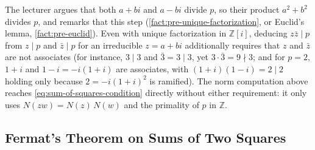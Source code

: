 \begin{aiNote}
The lecturer argues that both $a + bi$ and $a - bi$ divide $p$, so their product $a^2 + b^2$ divides $p$, and remarks that this step  (\cref{fact:pre-unique-factorization}, or Euclid's lemma, \cref{fact:pre-euclid}). Even with unique factorization in $\mathbb{Z}[i]$, deducing $z \bar{z} \mid p$ from $z \mid p$ and $\bar{z} \mid p$ for an irreducible $z = a + bi$ additionally requires that $z$ and $\bar{z}$ are not associates (for instance, $3 \mid 3$ and $\bar{3} = 3 \mid 3$, yet $3 \cdot \bar{3} = 9 \nmid 3$; and for $p = 2$, $1 + i$ and $1 - i = -i(1 + i)$ are associates, with $(1 + i)(1 - i) = 2 \mid 2$ holding only because $2 = -i(1 + i)^2$ is ramified). The norm computation above reaches \eqref{eq:sum-of-squares-condition} directly without either requirement: it only uses $N(zw) = N(z) \, N(w)$ and the primality of $p$ in $\mathbb{Z}$.
\end{aiNote}

\subsection{Fermat's Theorem on Sums of Two Squares}

